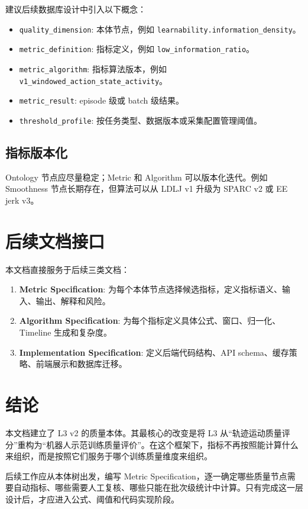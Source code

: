 \documentclass[UTF8,zihao=-4,oneside,openany]{ctexrep}
\newcommand{\Code}[1]{\texttt{#1}}
\newcommand{\Term}[1]{\textbf{#1}}
\begin{document}
建议后续数据库设计中引入以下概念：
\begin{itemize}
  \item \Code{quality\_dimension}: 本体节点，例如 \Code{learnability.information\_density}。
  \item \Code{metric\_definition}: 指标定义，例如 \Code{low\_information\_ratio}。
  \item \Code{metric\_algorithm}: 指标算法版本，例如 \Code{v1\_windowed\_action\_state\_activity}。
  \item \Code{metric\_result}: episode 级或 batch 级结果。
  \item \Code{threshold\_profile}: 按任务类型、数据版本或采集配置管理阈值。
\end{itemize}

\subsection{指标版本化}

Ontology 节点应尽量稳定；Metric 和 Algorithm 可以版本化迭代。例如 Smoothness 节点长期存在，但算法可以从 LDLJ v1 升级为 SPARC v2 或 EE jerk v3。

\section{后续文档接口}

本文档直接服务于后续三类文档：

\begin{enumerate}
  \item \Term{Metric Specification}: 为每个本体节点选择候选指标，定义指标语义、输入、输出、解释和风险。
  \item \Term{Algorithm Specification}: 为每个指标定义具体公式、窗口、归一化、Timeline 生成和复杂度。
  \item \Term{Implementation Specification}: 定义后端代码结构、API schema、缓存策略、前端展示和数据库迁移。
\end{enumerate}

\section{结论}

本文档建立了 L3 v2 的质量本体。其最核心的改变是将 L3 从“轨迹运动质量评分”重构为“机器人示范训练质量评价”。在这个框架下，指标不再按照能计算什么来组织，而是按照它们服务于哪个训练质量维度来组织。

后续工作应从本体树出发，编写 Metric Specification，逐一确定哪些质量节点需要自动指标、哪些需要人工复核、哪些只能在批次级统计中计算。只有完成这一层设计后，才应进入公式、阈值和代码实现阶段。
\end{document}
